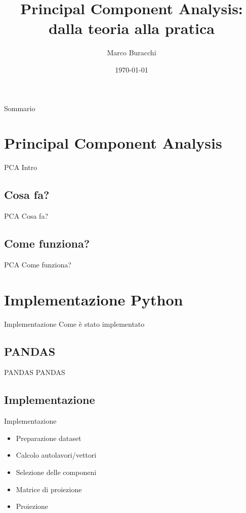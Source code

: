 \documentclass[utf8, a4paper]{beamer}
\title[PCA]{Principal Component Analysis:\\dalla teoria alla pratica}
\author[Marco Buracchi]{Marco Buracchi}
\date{\today}
\institute{Università degli studi di Firenze}
\begin{document}
\maketitle

\begin{frame}{Sommario}

  \tableofcontents

\end{frame}

\section{Principal Component Analysis}

	\begin{frame}{PCA}
		Intro
	\end{frame}

	\subsection{Cosa fa?}
		\begin{frame}{PCA}
			Cosa fa?
		\end{frame}
		
	\subsection{Come funziona?}
		\begin{frame}{PCA}
			Come funziona?
		\end{frame}
	
\section{Implementazione Python}

	\begin{frame}{Implementazione}
		Come è stato implementato
	\end{frame}

	\subsection{PANDAS}
		\begin{frame}{PANDAS}
			PANDAS
		\end{frame}
	
	\subsection{Implementazione}
		\begin{frame}{Implementazione}
			\begin{itemize}
				\item Preparazione dataset
				\item Calcolo autolavori/vettori
				\item Selezione delle componeni
				\item Matrice di proiezione
				\item Proiezione
			\end{itemize}
		\end{frame}
\end{document}
